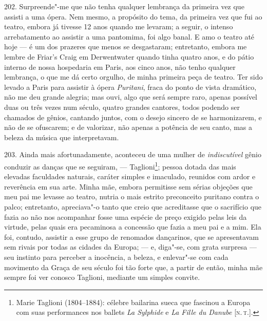 202. Surpreende"-me que não tenha qualquer lembrança da primeira vez que
assisti a uma ópera. Nem mesmo, a propósito do tema, da primeira vez que
fui ao teatro, embora já tivesse 12 anos quando me levaram; a seguir, o
intenso arrebatamento ao assistir a uma pantomima, foi algo banal. E amo
o teatro até hoje --- é um dos prazeres que menos se desgastaram;
entretanto, embora me lembre de Friar's Craig em Derwentwater quando
tinha quatro anos, e do pátio interno de nossa hospedaria em Paris, aos
cinco anos, não tenho qualquer lembrança, o que me dá certo orgulho, de
minha primeira peça de teatro. Ter sido levado a Paris para assistir à
ópera \emph{Puritani}, fraca do ponto de vista dramático, não me deu
grande alegria; mas ouvi, algo que será sempre raro, apenas possível
duas ou três vezes num século, quatro grandes cantores, todos podendo
ser chamados de gênios, cantando juntos, com o desejo sincero de se
harmonizarem, e não de se ofuscarem; e de valorizar, não apenas a
potência de seu canto, mas a beleza da música que interpretavam.

203. Ainda mais afortunadamente, aconteceu de uma mulher de
\emph{indiscutível} gênio conduzir as danças que se seguiram, ---
Taglioni\footnote{Marie Taglioni (1804--1884): célebre bailarina sueca
  que fascinou a Europa com suas performances nos ballets \emph{La
  Sylphide} e \emph{La Fille du Danube} {[}\textsc{n.\,t.}{]}.}; pessoa dotada
das mais elevadas faculdades naturais, caráter simples e imaculado,
reunidos com ardor e reverência em sua arte. Minha mãe, embora
permitisse sem sérias objeções que meu pai me levasse ao teatro, nutria
o mais estrito preconceito puritano contra o palco; entretanto,
apreciava"-o tanto que creio que acreditasse que o sacrifício que fazia
ao não nos acompanhar fosse uma espécie de preço exigido pelas leis da
virtude, pelas quais era pecaminosa a concessão que fazia a meu pai e a
mim. Ela foi, contudo, assistir a esse grupo de renomados dançarinos,
que se apresentavam sem rivais por todas as cidades da Europa; --- e,
diga"-se, com grata surpresa --- seu instinto para perceber a inocência, a
beleza, e enlevar"-se com cada movimento da Graça de seu século foi tão
forte que, a partir de então, minha mãe sempre foi ver conosco Taglioni,
mediante um simples convite.

